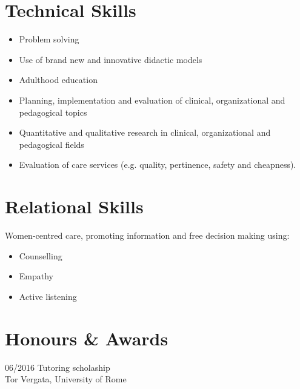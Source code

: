 \documentclass[]{friggeri-cv}
\begin{document}
\section{Technical Skills}
	\begin{itemize}
		\item Problem solving
		\item Use of brand new and innovative didactic models
		\item Adulthood education
		\item Planning, implementation and evaluation of clinical, organizational and pedagogical topics
		\item Quantitative and qualitative research in clinical, organizational and pedagogical fields
		\item Evaluation of care services (e.g. quality, pertinence, safety and cheapness).
	\end{itemize}

\section{Relational Skills}
	Women-centred care, promoting information and free decision making using:
	\begin{itemize}
		\item Counselling
		\item Empathy
		\item Active listening
	\end{itemize}
	
\section{Honours \& Awards}
\begin{entrylist}
	\entry
	{06/2016}
	{Tutoring scholaship}
	{\\Tor Vergata, University of Rome}
	{}
	{}
\end{entrylist}
\end{document}
